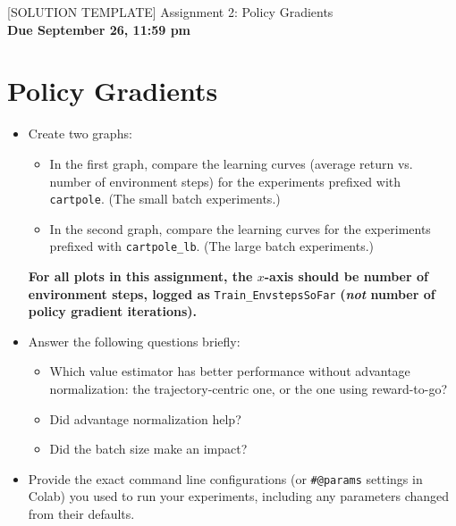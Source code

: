 \documentclass{article}
\begin{document}

\begin{centering}
    {\Large [SOLUTION TEMPLATE] Assignment 2: Policy Gradients} \\
    \vspace{.25cm}
    \textbf{Due September 26, 11:59 pm} \\
\end{centering}

\setcounter{section}{3}
\section{Policy Gradients}
\begin{itemize}
\item Create two graphs:
\begin{itemize}
\item In the first graph, compare the learning curves (average return vs. number of environment steps) for the experiments prefixed with \verb|cartpole|. (The small batch experiments.)
\item In the second graph, compare the learning curves for the experiments prefixed with \verb|cartpole_lb|. (The large batch experiments.)
\end{itemize}
\textbf{For all plots in this assignment, the $x$-axis should be number of environment steps, logged as} \verb|Train_EnvstepsSoFar| \textbf{(\textit{not} number of policy gradient iterations).}
\item Answer the following questions briefly: 
\begin{itemize}
\item Which value estimator has better performance without advantage normalization: the trajectory-centric one, or the one using reward-to-go?
\item Did advantage normalization help?
\item Did the batch size make an impact?
\end{itemize}
\item Provide the exact command line configurations (or \texttt{\#@params} settings in Colab) you used to run your experiments, including any parameters changed from their defaults.
\end{itemize}
\end{document}
